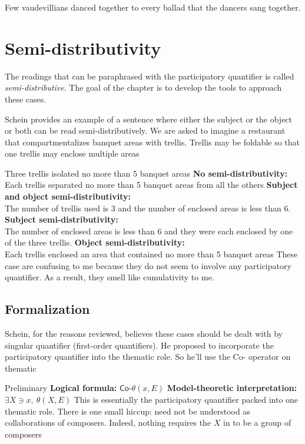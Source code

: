 \ex
Few vaudevillians danced together to every ballad that {\bg the dancers} sang together.
\xe
%

\section{Semi-distributivity}

The readings that can be paraphrased with the participatory quantifier is called \emph{semi-distributive}. The goal of the chapter is to develop the tools to approach these cases. 

Schein provides an example of a sentence where either the subject or the object or both can be read semi-distributively. We are asked to imagine a restaurant that compartmentalizes banquet areas with trellis. Trellis may be foldable so that one trellis may enclose multiple areas

\pex
Three trellis isolated no more than 5 banquet areas
\a 
\textbf{No semi-distributivity:} 
Each trellis separated no more than 5 banquet areas from all the others
\a
\textbf{Subject and object semi-distributivity:}\\
The number of trellis used is 3 and the number of enclosed areas is less than 6.
\a 
\textbf{Subject semi-distributivity:}\\
The number of enclosed areas is less than 6 and they were each enclosed by one of the three trellis.
\a 
\textbf{Object semi-distributivity:}\\
Each trellis enclosed an area that contained no more than 5 banquet areas
\xe
%
These case are confusing to me because they do not seem to involve any participatory quantifier. As a result, they smell like cumulativity to me.

\subsection{Formalization}
Schein, for the reasons reviewed, believes these cases should be dealt with by singular quantifier (first-order quantifiers). He proposed to incorporate the participatory quantifier into the thematic role. So he'll use the \textsf{Co-} operator on thematic

\pex Preliminary
\a \textbf{Logical formula:}
$\textsf{Co-}\theta(x, E)$
\a \textbf{Model-theoretic interpretation:}\\
$\exists X\ni x,\ \theta (X, E)$
\xe
%
This is essentially the participatory quantifier packed into one thematic role. There is one small hiccup: \cnextx need not be understood as collaborations of composers. Indeed, nothing requires the $X$ in \clastxb to be a group of composers

